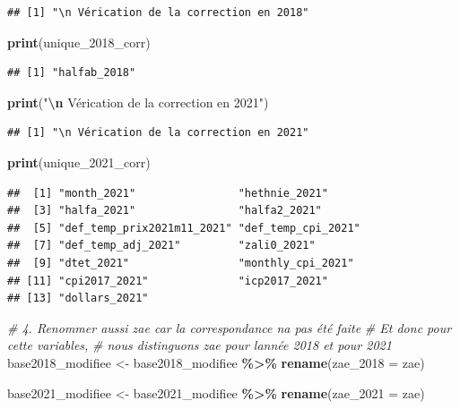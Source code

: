 \documentclass[
]{article}
\newenvironment{Shaded}{\begin{snugshade}}{\end{snugshade}}
\newcommand{\AttributeTok}[1]{\textcolor[rgb]{0.13,0.29,0.53}{#1}}
\newcommand{\CommentTok}[1]{\textcolor[rgb]{0.56,0.35,0.01}{\textit{#1}}}
\newcommand{\FunctionTok}[1]{\textcolor[rgb]{0.13,0.29,0.53}{\textbf{#1}}}
\newcommand{\NormalTok}[1]{#1}
\newcommand{\OtherTok}[1]{\textcolor[rgb]{0.56,0.35,0.01}{#1}}
\newcommand{\SpecialCharTok}[1]{\textcolor[rgb]{0.81,0.36,0.00}{\textbf{#1}}}
\newcommand{\StringTok}[1]{\textcolor[rgb]{0.31,0.60,0.02}{#1}}
\begin{document}
\begin{verbatim}
## [1] "\n Vérication de la correction en 2018"
\end{verbatim}

\begin{Shaded}
\begin{Highlighting}[]
\FunctionTok{print}\NormalTok{(unique\_2018\_corr)}
\end{Highlighting}
\end{Shaded}

\begin{verbatim}
## [1] "halfab_2018"
\end{verbatim}

\begin{Shaded}
\begin{Highlighting}[]
\FunctionTok{print}\NormalTok{(}\StringTok{"}\SpecialCharTok{\textbackslash{}n}\StringTok{ Vérication de la correction en 2021"}\NormalTok{)}
\end{Highlighting}
\end{Shaded}

\begin{verbatim}
## [1] "\n Vérication de la correction en 2021"
\end{verbatim}

\begin{Shaded}
\begin{Highlighting}[]
\FunctionTok{print}\NormalTok{(unique\_2021\_corr)}
\end{Highlighting}
\end{Shaded}

\begin{verbatim}
##  [1] "month_2021"                "hethnie_2021"             
##  [3] "halfa_2021"                "halfa2_2021"              
##  [5] "def_temp_prix2021m11_2021" "def_temp_cpi_2021"        
##  [7] "def_temp_adj_2021"         "zali0_2021"               
##  [9] "dtet_2021"                 "monthly_cpi_2021"         
## [11] "cpi2017_2021"              "icp2017_2021"             
## [13] "dollars_2021"
\end{verbatim}

\begin{Shaded}
\begin{Highlighting}[]
\CommentTok{\# 4. Renommer aussi zae car la correspondance n\textquotesingle{}a pas été faite }
\CommentTok{\# Et donc pour cette variables, }
\CommentTok{\# nous distinguons zae pour l\textquotesingle{}année 2018 et pour 2021}
\NormalTok{base2018\_modifiee }\OtherTok{\textless{}{-}}\NormalTok{ base2018\_modifiee }\SpecialCharTok{\%\textgreater{}\%}
  \FunctionTok{rename}\NormalTok{(}\AttributeTok{zae\_2018 =}\NormalTok{ zae)}

\NormalTok{base2021\_modifiee }\OtherTok{\textless{}{-}}\NormalTok{ base2021\_modifiee }\SpecialCharTok{\%\textgreater{}\%}
  \FunctionTok{rename}\NormalTok{(}\AttributeTok{zae\_2021 =}\NormalTok{ zae)}
\end{Highlighting}
\end{Shaded}
\end{document}
